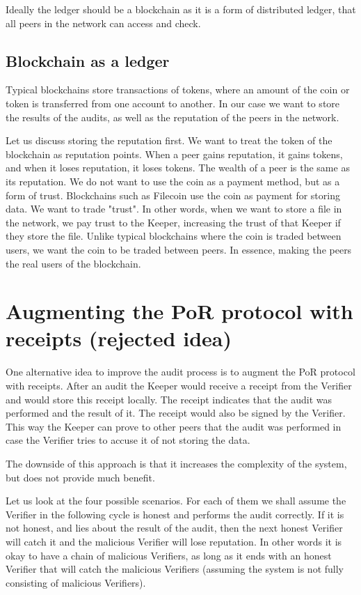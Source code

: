 Ideally the ledger should be a blockchain as it is a form of distributed ledger,
that all peers in the network can access and check.

\subsection{Blockchain as a ledger}

Typical blockchains store transactions of tokens, where an amount of the coin or token
is transferred from one account to another.
In our case we want to store the results of the audits,
as well as the reputation of the peers in the network.

Let us discuss storing the reputation first.
We want to treat the token of the blockchain as reputation points.
When a peer gains reputation, it gains tokens, and when it loses reputation, it loses tokens.
The wealth of a peer is the same as its reputation.
We do not want to use the coin as a payment method, but as a form of trust.
Blockchains such as Filecoin \cite{filecoin} use the coin as payment for storing data.
We want to trade "trust".
In other words, when we want to store a file in the network, we pay trust to the Keeper,
increasing the trust of that Keeper if they store the file.
Unlike typical blockchains where the coin is traded between users,
we want the coin to be traded between peers.
In essence, making the peers the real users of the blockchain.

\section{Augmenting the PoR protocol with receipts (rejected idea)}

One alternative idea to improve the audit process is to augment the PoR protocol with receipts.
After an audit the Keeper would receive a receipt from the Verifier and would store this
receipt locally.
The receipt indicates that the audit was performed and the result of it.
The receipt would also be signed by the Verifier.
This way the Keeper can prove to other peers that the audit was performed
in case the Verifier tries to accuse it of not storing the data.

The downside of this approach is that it increases the complexity of the system,
but does not provide much benefit.

Let us look at the four possible scenarios.
For each of them we shall assume the Verifier in the following cycle is honest
and performs the audit correctly.
If it is not honest, and lies about the result of the audit,
then the next honest Verifier will catch it and the malicious Verifier will lose reputation.
In other words it is okay to have a chain of malicious Verifiers,
as long as it ends with an honest Verifier that will catch the malicious Verifiers
(assuming the system is not fully consisting of malicious Verifiers).

